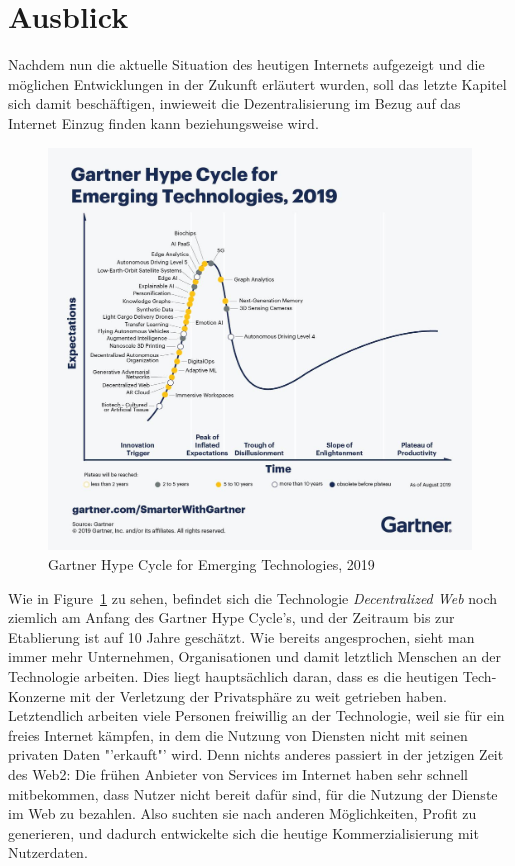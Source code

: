 \section{Ausblick}

Nachdem nun die aktuelle Situation des heutigen Internets aufgezeigt und die möglichen Entwicklungen in der Zukunft erläutert wurden, soll das letzte Kapitel sich damit beschäftigen, inwieweit die Dezentralisierung im Bezug auf das Internet Einzug finden kann beziehungsweise wird.

\begin{figure}
	\includegraphics[width=\linewidth]{images/5TrendsAppear.jpg}
	\caption{Gartner Hype Cycle for Emerging Technologies, 2019~\cite{Panetta.2019}}
	\label{fig:gartnerhype}
\end{figure}

Wie in Figure~\ref{fig:gartnerhype} zu sehen, befindet sich die Technologie \textit{Decentralized Web} noch ziemlich am Anfang des Gartner Hype Cycle's, und der Zeitraum bis zur Etablierung ist auf 10 Jahre geschätzt. 
Wie bereits angesprochen, sieht man immer mehr Unternehmen, Organisationen und damit letztlich Menschen an der Technologie arbeiten. Dies liegt hauptsächlich daran, dass es die heutigen Tech-Konzerne mit der Verletzung der Privatsphäre zu weit getrieben haben. Letztendlich arbeiten viele Personen freiwillig an der Technologie, weil sie für ein freies Internet kämpfen, in dem die Nutzung von Diensten nicht mit seinen privaten Daten "'erkauft"' wird. Denn nichts anderes passiert in der jetzigen Zeit des Web2: Die frühen Anbieter von Services im Internet haben sehr schnell mitbekommen, dass Nutzer nicht bereit dafür sind, für die Nutzung der Dienste im Web zu bezahlen. Also suchten sie nach anderen Möglichkeiten, Profit zu generieren, und dadurch entwickelte sich die heutige Kommerzialisierung mit Nutzerdaten.


